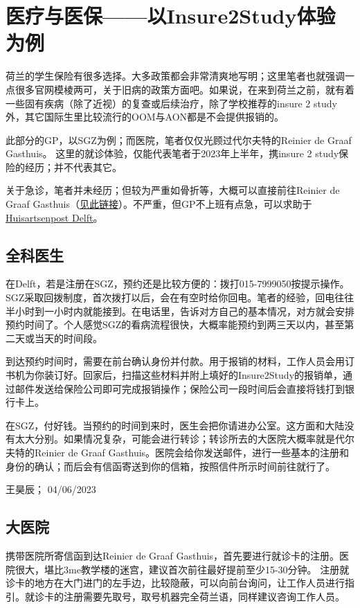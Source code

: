 \vspace{\betsubsec} %
\section{医疗与医保——以Insure2Study体验为例}
荷兰的学生保险有很多选择。大多政策都会非常清爽地写明；这里笔者也就强调一点很多官网模棱两可，关于旧病的政策方面吧。如果说，在来到荷兰之前，就有着一些固有疾病（除了近视）的复查或后续治疗，除了学校推荐的insure 2 study外，其它国际生里比较流行的OOM与AON都是不会提供报销的。

此部分的GP，以SGZ为例；而医院，笔者仅仅光顾过代尔夫特的Reinier de Graaf Gasthuis。 这里的就诊体验，仅能代表笔者于2023年上半年，携insure 2 study保险的经历；并不代表其它。

关于急诊，笔者并未经历；但较为严重如骨折等，大概可以直接前往Reinier de Graaf Gasthuis（\href{https://reinierdegraaf.nl/specialisme/spoedeisende-hulp}{\uline{见此链接}}）。不严重，但GP不上班有点急，可以求助于\href{https://hapschievliet.nl/language/english/}{\uline{Huisartsenpost Delft}}。


\subsection{全科医生}
在Delft，若是注册在SGZ，预约还是比较方便的：拨打015-7999050按提示操作。SGZ采取回拨制度，首次拨打以后，会在有空时给你回电。笔者的经验，回电往往半小时到一小时内就能接到。在电话里，告诉对方自己的基本情况，对方就会安排预约时间了。个人感觉SGZ的看病流程很快，大概率能预约到两三天以内，甚至第二天或当天的时间段。

到达预约时间时，需要在前台确认身份并付款。用于报销的材料，工作人员会用订书机为你装订好。回家后，扫描这些材料并附上填好的Insure2Study的报销单，通过邮件发送给保险公司即可完成报销操作；保险公司一段时间后会直接将钱打到银行卡上。

在SGZ，付好钱。当预约的时间到来时，医生会把你请进办公室。这方面和大陆没有太大分别。如果情况复杂，可能会进行转诊；转诊所去的大医院大概率就是代尔夫特的Reinier de Graaf Gasthuis。医院会给你发送邮件，进行一些基本的注册和身份的确认；而后会有信函寄送到你的信箱，按照信件所示时间前往就行了。
\begin{flushright}
王昊辰； 04/06/2023
\end{flushright}

\subsection{大医院}
携带医院所寄信函到达Reinier de Graaf Gasthuis，首先要进行就诊卡的注册。医院很大，堪比3me教学楼的迷宫，建议首次前往最好提前至少15-30分钟。 注册就诊卡的地方在大门进门的左手边，比较隐蔽，可以向前台询问，让工作人员进行指引。就诊卡的注册需要先取号，取号机器完全荷兰语，同样建议咨询工作人员。

